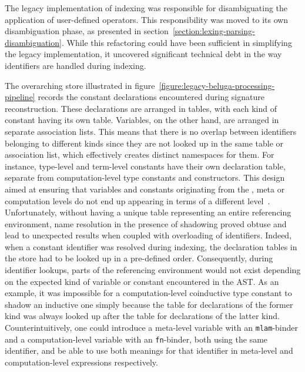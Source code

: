 

The legacy implementation of indexing was responsible for disambiguating the application of user-defined operators.
This responsibility was moved to its own disambiguation phase, as presented in section~\ref{section:lexing-parsing-disambiguation}.
While this refactoring could have been sufficient in simplifying the legacy implementation, it uncovered significant technical debt in the way identifiers are handled during indexing.

The overarching store illustrated in figure~\ref{figure:legacy-beluga-processing-pipeline} records the constant declarations encountered during signature reconstruction.
These declarations are arranged in tables, with each kind of constant having its own table.
Variables, on the other hand, are arranged in separate association lists.
This means that there is no overlap between identifiers belonging to different kinds since they are not looked up in the same table or association list, which effectively creates distinct namespaces for them.
For instance, \LF type-level and term-level constants have their own declaration table, separate from computation-level type constants and constructors.
This design aimed at ensuring that variables and constants originating from the \LF, meta or computation levels do not end up appearing in terms of a different level~\cite{germain2010implementation}.
Unfortunately, without having a unique table representing an entire referencing environment, name resolution in the presence of shadowing proved obtuse and lead to unexpected results when coupled with overloading of identifiers.
Indeed, when a constant identifier was resolved during indexing, the declaration tables in the store had to be looked up in a pre-defined order.
Consequently, during identifier lookups, parts of the referencing environment would not exist depending on the expected kind of variable or constant encountered in the \ac{AST}.
As an example, it was impossible for a computation-level coinductive type constant to shadow an inductive one simply because the table for declarations of the former kind was always looked up after the table for declarations of the latter kind.
Counterintuitively, one could introduce a meta-level variable with an \verb|mlam|-binder and a computation-level variable with an \verb|fn|-binder, both using the same identifier, and be able to use both meanings for that identifier in meta-level and computation-level expressions respectively.

